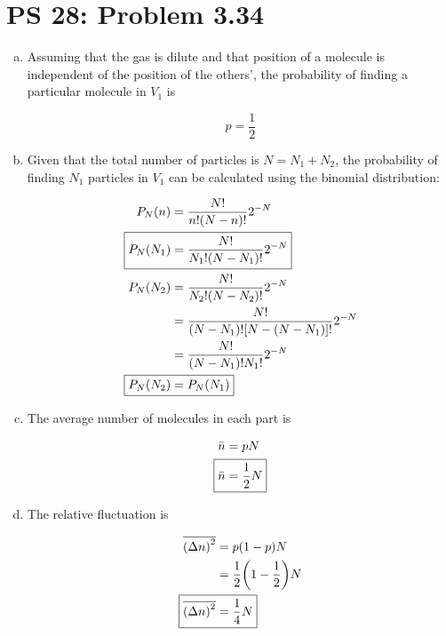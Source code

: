 \documentclass[12pt,a4paper]{article}
\begin{document}
\setcounter{page}{1}

\section*{PS 28: Problem 3.34}
\bigskip

\begin{enumerate}[(a)]

\item Assuming that the gas is dilute and that position of a molecule is independent of the position of the others', the probability of finding a particular molecule in $V_1$ is

\begin{equation}\label{eq:answer-a}
	\boxed{
	p = \frac{1}{2}
	}
\end{equation}

\item Given that the total number of particles is $N = N_1 + N_2$, the probability of finding $N_1$ particles in $V_1$ can be calculated using the binomial distribution:

\begin{align}
	P_N(n) &= \frac{N!}{n!\qty(N-n)!} 2^{-N} \label{eq:binomial} \\
	\Aboxed{
		P_N(N_1) &= \frac{N!}{N_1!\qty(N-N_1)!} 2^{-N}
	} \label{eq:answer-b1} \\
	P_N(N_2) &= \frac{N!}{N_2!\qty(N-N_2)!} 2^{-N} \nonumber \\
	&= \frac{N!}{\qty(N-N_1)!\qty[N-\qty(N-N_1)]!}2^{-N} \nonumber \\
	&= \frac{N!}{\qty(N-N_1)! N_1!}2^{-N} \nonumber \\
	\Aboxed{
		P_N(N_2) &= P_N(N_1)
	} \label{eq:answer-b2}
\end{align}

\item The average number of molecules in each part is

\begin{align}
	\bar{n} &= pN \label{eq:mean} \\
	\Aboxed{
		\bar{n} &= \frac{1}{2}N
	} \label{eq:answer-c}
\end{align}

\item The relative fluctuation is

\begin{align}
	\overline{\qty(\Delta n)^2} &= p\qty(1-p)N \label{eq:fluc} \\
	&= \frac{1}{2}\qty(1 - \frac{1}{2})N \nonumber \\
	\Aboxed{
		\overline{\qty(\Delta n)^2} &= \frac{1}{4}N
	} \label{eq:answer-d}
\end{align}

\end{enumerate}
\end{document}
